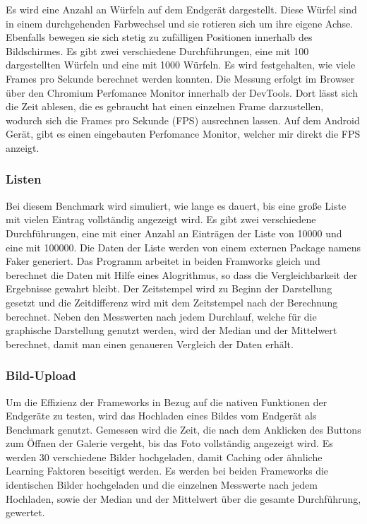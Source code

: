 Es wird eine Anzahl an Würfeln auf dem Endgerät dargestellt. Diese Würfel sind in einem durchgehenden Farbwechsel und sie rotieren sich um ihre eigene Achse. Ebenfalls bewegen sie sich stetig zu zufälligen Positionen innerhalb des Bildschirmes. Es gibt zwei verschiedene Durchführungen, eine mit 100 dargestellten Würfeln und eine mit 1000 Würfeln. Es wird festgehalten, wie viele Frames pro Sekunde berechnet werden konnten. Die Messung erfolgt im Browser über den Chromium Perfomance Monitor innerhalb der DevTools. Dort lässt sich die Zeit ablesen, die es gebraucht hat einen einzelnen Frame darzustellen, wodurch sich die Frames pro Sekunde (FPS) ausrechnen lassen. Auf dem Android Gerät, gibt es einen eingebauten Perfomance Monitor, welcher mir direkt die FPS anzeigt.

\subsubsection*{Listen}

Bei diesem Benchmark wird simuliert, wie lange es dauert, bis eine große Liste mit vielen Eintrag vollständig angezeigt wird. Es gibt zwei verschiedene Durchführungen, eine mit einer Anzahl an Einträgen der Liste von 10000 und eine mit 100000. Die Daten der Liste werden von einem externen Package namens Faker generiert. Das Programm arbeitet in beiden Framworks gleich und berechnet die Daten mit Hilfe eines Alogrithmus, so dass die Vergleichbarkeit der Ergebnisse gewahrt bleibt. Der Zeitstempel wird zu Beginn der Darstellung gesetzt und die Zeitdifferenz wird mit dem Zeitstempel nach der Berechnung berechnet. Neben den Messwerten nach jedem Durchlauf, welche für die graphische Darstellung genutzt werden, wird der Median und der Mittelwert berechnet, damit man einen genaueren Vergleich der Daten erhält.

\subsubsection*{Bild-Upload}

Um die Effizienz der Frameworks in Bezug auf die nativen Funktionen der Endgeräte zu testen, wird das Hochladen eines Bildes vom Endgerät als Benchmark genutzt. Gemessen wird die Zeit, die nach dem Anklicken des Buttons zum Öffnen der Galerie vergeht, bis das Foto vollständig angezeigt wird. Es werden 30 verschiedene Bilder hochgeladen, damit Caching oder ähnliche Learning Faktoren beseitigt werden. Es werden bei beiden Frameworks die identischen Bilder hochgeladen und die einzelnen Messwerte nach jedem Hochladen, sowie der Median und der Mittelwert über die gesamte Durchführung, gewertet.

